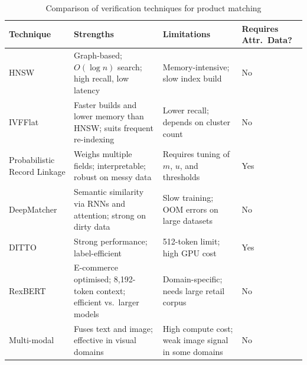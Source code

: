 \begin{table}[H]
    \centering
    \small
    \renewcommand{\arraystretch}{1.4}
    \begin{tabularx}{\textwidth}{p{3.0cm} X X p{1.8cm}}
        \toprule
        \textbf{Technique} & \textbf{Strengths} & \textbf{Limitations} & \textbf{Requires Attr.\ Data?} \\
        \midrule
        HNSW & Graph-based; $O(\log n)$ search; high recall, low latency & Memory-intensive; slow index build & No \\
        IVFFlat & Faster builds and lower memory than HNSW; suits frequent re-indexing & Lower recall; depends on cluster count & No \\
        Probabilistic Record Linkage & Weighs multiple fields; interpretable; robust on messy data & Requires tuning of $m$, $u$, and thresholds & Yes \\
        DeepMatcher & Semantic similarity via RNNs and attention; strong on dirty data & Slow training; OOM errors on large datasets & No \\
        DITTO & Strong performance; label-efficient & 512-token limit; high GPU cost & Yes \\
        RexBERT & E-commerce optimised; 8,192-token context; efficient vs.\ larger models & Domain-specific; needs large retail corpus & No \\
        Multi-modal & Fuses text and image; effective in visual domains & High compute cost; weak image signal in some domains & No \\
        \bottomrule
    \end{tabularx}
    \caption{Comparison of verification techniques for product matching}
    \label{tab:verification_comparison}
\end{table}
